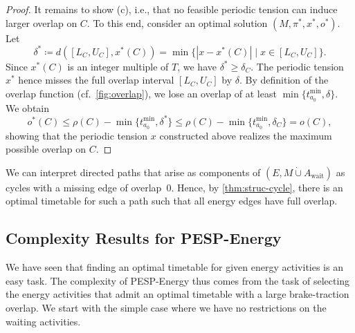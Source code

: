 \documentclass[11pt,a4paper]{article}
\newcommand{\dotcup}{\mathbin{\dot\cup}}
\newcommand{\wait}{\mathrm{wait}}
\newcommand{\energyact}{M}               %
\newcommand{\pespenergy}{PESP-Energy\xspace}
\newcommand{\w}{\rho} %
\theoremstyle{definition}
\theoremstyle{remark}
\begin{document}
\begin{proof}
    It remains to show (c), i.e., that no feasible periodic tension can induce larger overlap on $C$. To this end, consider an optimal solution $(\energyact, \pi^*, x^*, o^*)$. Let 
    \[\delta^* \coloneqq d([L_C, U_C], x^*(C)) = \min \{|x-x^*(C)| \mid x \in [L_C, U_C]\}.\]
    Since $x^*(C)$ is an integer multiple of $T$, we have $\delta^* \geq \delta_C$. The periodic tension $x^*$ hence misses the full overlap interval $[L_C, U_C]$ by $\delta$. By definition of the overlap function (cf.~\cref{fig:overlap}), we lose an overlap of at least $\min\{t_{a_0}^{\min}, \delta\}$. We obtain
    $$o^*(C) \leq \w(C) - \min\{t_{a_0}^{\min}, \delta^*\} \leq \w(C) - \min\{t_{a_0}^{\min}, \delta_C\} = o(C),$$
    showing that the periodic tension $x$ constructed above realizes the maximum possible overlap on $C$.
\end{proof}

We can interpret directed paths that arise as components of $(E, \energyact \dotcup A_\wait)$ as cycles with a missing edge of overlap~0.
Hence, by \cref{thm:struc-cycle}, there is an optimal timetable for such a path such that all energy edges have full overlap.


\subsection{Complexity Results for \pespenergy}
\label{ss:pesp-energy-complexity}

We have seen that finding an optimal timetable for given energy activities is an easy task. The complexity of \pespenergy thus comes from the task of selecting the energy activities that admit an optimal timetable with a large brake-traction overlap. We start with the simple case where we have no restrictions on the waiting activities.
\end{document}

